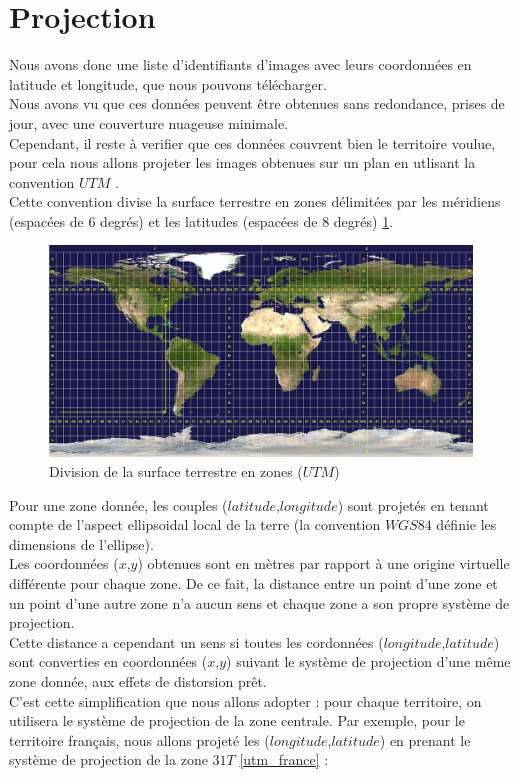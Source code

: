 \documentclass{book}
\begin{document}
\clearpage

\section{Projection}

Nous avons donc une liste d'identifiants d'images avec leurs coordonnées en latitude et longitude, que nous pouvons télécharger.\\
Nous avons vu que ces données peuvent être obtenues sans redondance, prises de jour, avec une couverture nuageuse minimale.\\
Cependant, il reste à verifier que ces données couvrent bien le territoire voulue, pour cela nous allons projeter les images obtenues
sur un plan en utlisant la convention $UTM$ \cite{wiki:utm}.\\
Cette convention divise la surface terrestre en zones délimitées par les méridiens (espacées de 6 degrés) et 
les latitudes (espacées de 8 degrés) \ref{utm}.
\begin{figure}[H]
\begin{center}
\includegraphics[scale=0.3]{images/utm_zones.jpg}
\end{center}
\caption{Division de la surface terrestre en zones ($UTM$) \cite{wiki:utm}}
\label{utm}
\end{figure}

\clearpage

Pour une zone donnée, les couples ($latitude$,$longitude$) sont projetés en tenant compte de l'aspect ellipsoidal local de la terre 
(la convention $WGS84$ définie les dimensions de l'ellipse).\\
Les coordonnées ($x$,$y$) obtenues sont en mètres par rapport à une origine virtuelle différente pour chaque zone. De ce fait, la distance
entre un point d'une zone et un point d'une autre zone n'a aucun sens et chaque zone a son propre système de projection.\\
Cette distance a cependant un sens si toutes les cordonnées ($longitude$,$latitude$) sont converties en coordonnées ($x$,$y$) suivant
le système de projection d'une même zone donnée, aux effets de distorsion prêt.\\
C'est cette simplification que nous allons adopter : pour chaque territoire, on utilisera le système de projection de la zone centrale.
Par exemple, pour le territoire français, nous allons projeté les ($longitude$,$latitude$) en prenant le système de projection
de la zone $31T$ \ref{utm_france} :
\end{document}
